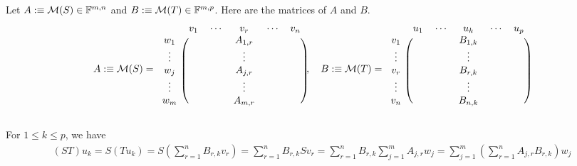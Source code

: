 Let $A :\equiv \mathcal{M}(S)\in \mathbb{F}^{m,n}$ and $B :\equiv \mathcal{M}(T)\in \mathbb{F}^{m,p}$. Here are the matrices of $A$ and $B$.
\begin{equation}
  A :\equiv \mathcal{M} (S) =
  \begin{blockarray}{cccccc}
    & v_1 & \cdots & v_r     & \cdots & v_n \\
    \begin{block}{c(ccccc)}
      w_1    &     &        & A_{1,r} &        &     \\
      \vdots &     &        & \vdots  &        &     \\
      w_j    &     &        & A_{j,r} &        &     \\
      \vdots &     &        & \vdots  &        &     \\
      w_m    &     &        & A_{m,r} &        &     \\
    \end{block}
  \end{blockarray},
  \quad
  B :\equiv \mathcal{M} (T) =
  \begin{blockarray}{cccccc}
    & u_1 & \cdots & u_k     & \cdots & u_p \\
    \begin{block}{c(ccccc)}
      v_1    &     &        & B_{1,k} &        &     \\
      \vdots &     &        & \vdots  &        &     \\
      v_r    &     &        & B_{r,k} &        &     \\
      \vdots &     &        & \vdots  &        &     \\
      v_n    &     &        & B_{n,k} &        &     \\
    \end{block}
  \end{blockarray}
\end{equation}

For $1 \leq k \leq p$, we have
\begin{equation}
  \begin{aligned}
    (ST) u_k
    = S (Tu_k)
    = S \left ( \sum_{r=1}^{n} B_{r,k} v_r \right )
    =  \sum_{r=1}^{n} B_{r,k} S v_r
    =  \sum_{r=1}^{n} B_{r,k} \sum_{j=1}^{m} A_{j,r}  w_j
    =  \sum_{j=1}^{m} \left( \sum_{r=1}^{n} A_{j,r}  B_{r,k} \right) w_j
  \end{aligned}
\end{equation}

